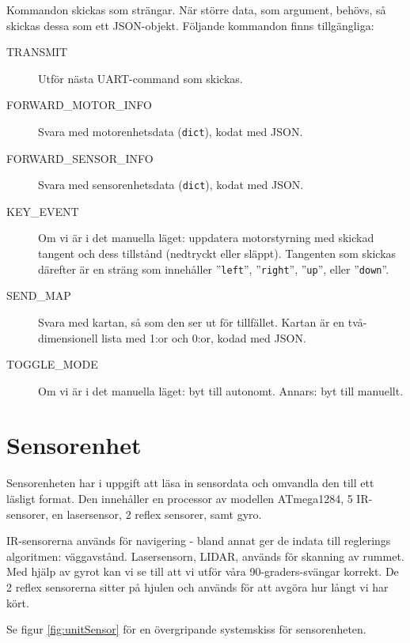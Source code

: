 \documentclass[a4paper,11pt]{article}
\begin{document}
Kommandon skickas som strängar. När större data, som argument, behövs, så skickas dessa som ett JSON-objekt. Följande kommandon finns tillgängliga:

\begin{description}
    \item [TRANSMIT] Utför nästa UART-command som skickas.
    \item [FORWARD\_MOTOR\_INFO] Svara med motorenhetsdata (\texttt{dict}), kodat med JSON.
    \item [FORWARD\_SENSOR\_INFO] Svara med sensorenhetsdata (\texttt{dict}), kodat med JSON.
    \item [KEY\_EVENT] Om vi är i det manuella läget: uppdatera motorstyrning med skickad tangent och dess tillstånd (nedtryckt eller släppt). Tangenten som skickas därefter är en sträng som innehåller ''\texttt{left}'', ''\texttt{right}'', ''\texttt{up}'', eller ''\texttt{down}''.
    \item [SEND\_MAP] Svara med kartan, så som den ser ut för tillfället. Kartan är en två-dimensionell lista med 1:or och 0:or, kodad med JSON.
    \item [TOGGLE\_MODE] Om vi är i det manuella läget: byt till autonomt. Annars: byt till manuellt.
\end{description}


\clearpage
\section{Sensorenhet} \label{sec:system1}
Sensorenheten har i uppgift att läsa in sensordata och omvandla den till ett läsligt format. Den innehåller en processor av modellen ATmega1284, 5 IR-sensorer, en lasersensor, 2 reflex sensorer, samt gyro.

IR-sensorerna används för navigering - bland annat ger de indata till reglerings algoritmen: väggavstånd. Lasersensorn, LIDAR, används för skanning av rummet. Med hjälp av gyrot kan vi se till att vi utför våra 90-graders-svängar korrekt. De 2 reflex sensorerna sitter på hjulen och används för att avgöra hur långt vi har kört.

Se figur \ref{fig:unitSensor} för en övergripande systemskiss för sensorenheten.
\end{document}
